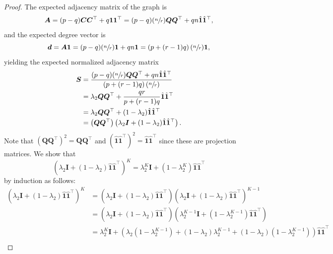 \documentclass{article}
\begin{document}
\begin{proof}
The expected adjacency matrix of the graph is
%
\begin{equation*}
    \bm{A} = (p-q) \bm{C}\bm{C}^\top + q \bm{1} \bm{1}^\top 
    = (p-q) (\sfrac{n}{r}) \bm{Q}\bm{Q}^\top + qn \hat{\bm{1}} \hat{\bm{1}}^\top,
\end{equation*}
%
and the expected degree vector is
%
\begin{equation*}
    \bm{d} = \bm{A} \bm{1} = (p-q) (\sfrac{n}{r}) \bm{1} + qn\bm{1} = \left( p + (r-1) q \right) (\sfrac{n}{r}) \bm{1},
\end{equation*}
%
yielding the expected normalized adjacency matrix
\begin{align*}
    \bm{S} 
    &= \frac{(p-q) (\sfrac{n}{r}) \bm{Q}\bm{Q}^\top + qn \hat{\bm{1}} \hat{\bm{1}}^\top}{\left( p + (r-1) q \right) (\sfrac{n}{r})} \\
    &= \lambda_2 \bm{Q}\bm{Q}^\top + \frac{qr}{p + (r-1) q} \hat{\bm{1}} \hat{\bm{1}}^\top \\
    &= \lambda_2 \bm{Q}\bm{Q}^\top + (1-\lambda_2) \hat{\bm{1}} \hat{\bm{1}}^\top \\
    &= \left( \bm{Q}\bm{Q}^\top \right) \left( \lambda_2 \bm{I}  + (1-\lambda_2) \hat{\bm{1}} \hat{\bm{1}}^\top \right) .
\end{align*}
%
Note that $\left(\bm{Q} \bm{Q}^\top\right)^2 = \bm{Q} \bm{Q}^\top$ and $\left( \hat{\bm{1}} \hat{\bm{1}}^\top \right)^2 = \hat{\bm{1}} \hat{\bm{1}}^\top$ since these are projection matrices.
We show that
%
\begin{equation*}
    \left( \lambda_2 \bm{I}  + (1-\lambda_2) \hat{\bm{1}} \hat{\bm{1}}^\top \right)^K
    = \lambda_2^K \bm{I}  + \left(1-\lambda_2^K\right) \hat{\bm{1}} \hat{\bm{1}}^\top
\end{equation*}
%
by induction as follows:
%
\begin{align*}
    \left( \lambda_2 \bm{I}  + (1-\lambda_2) \hat{\bm{1}} \hat{\bm{1}}^\top \right)^{K}
    &= \left( \lambda_2 \bm{I}  + (1-\lambda_2) \hat{\bm{1}} \hat{\bm{1}}^\top \right) \left( \lambda_2 \bm{I}  + (1-\lambda_2) \hat{\bm{1}} \hat{\bm{1}}^\top \right)^{K-1} \\
    &= \left( \lambda_2 \bm{I}  + (1-\lambda_2) \hat{\bm{1}} \hat{\bm{1}}^\top \right) \left( \lambda_2^{K-1} \bm{I}  + \left(1-\lambda_2^{K-1}\right) \hat{\bm{1}} \hat{\bm{1}}^\top \right) \\
    &= \lambda_2^K \bm{I}  + \left( \lambda_2 \left(1-\lambda_2^{K-1}\right) + (1-\lambda_2) \lambda_2^{K-1} + (1-\lambda_2) \left(1-\lambda_2^{K-1}\right) \right) \hat{\bm{1}} \hat{\bm{1}}^\top\\

\end{align*}
\end{proof}
\end{document}

